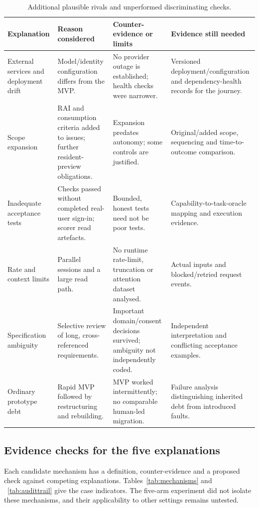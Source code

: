 \FloatBarrier
\begin{table}[!htbp]
\centering\footnotesize
\caption{Additional plausible rivals and unperformed discriminating checks.}\label{tab:rivalsadditional}
\begin{tabularx}{\textwidth}{@{}L{2.7cm}YYY@{}}
\toprule
Explanation & Reason considered & Counter-evidence or limits & Evidence still needed \\
\midrule
External services and deployment drift & Model/identity configuration differs
from the MVP\@. & No provider outage is established; health checks were narrower. &
Versioned deployment/configuration and dependency-health records for the journey. \\
Scope expansion & RAI and consumption criteria added to issues; further
resident-preview obligations. & Expansion predates autonomy; some controls
are justified. & Original/added scope, sequencing and time-to-outcome comparison. \\
Inadequate acceptance tests & Checks passed without completed real-user sign-in;
scorer read artefacts. & Bounded, honest tests need not be poor tests. &
Capability-to-task-oracle mapping and execution evidence. \\
Rate and context limits & Parallel sessions and a large read path. & No runtime
rate-limit, truncation or attention dataset analysed. & Actual inputs and
blocked/retried request events. \\
Specification ambiguity & Selective review of long, cross-referenced requirements.
& Important domain/consent decisions survived; ambiguity not independently coded.
& Independent interpretation and conflicting acceptance examples. \\
Ordinary prototype debt & Rapid MVP followed by restructuring and rebuilding.
& MVP worked intermittently; no comparable human-led migration. & Failure
analysis distinguishing inherited debt from introduced faults. \\
\bottomrule
\end{tabularx}
\end{table}
\FloatBarrier

\subsection{Evidence checks for the five explanations}\label{app:mechanismaudit}

Each candidate mechanism has a definition, counter-evidence and a proposed
check against competing explanations. Tables~\ref{tab:mechanisms} and
~\ref{tab:audittrail} give the case indicators. The five-arm experiment did
not isolate these mechanisms, and their applicability to other settings
remains untested.

